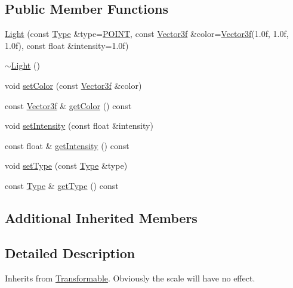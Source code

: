 \subsection*{Public Member Functions}
\begin{DoxyCompactItemize}
\item 
\hyperlink{classburn_1_1_light_a70a09e0609abe704f3e65d4790b6d6ce}{Light} (const \hyperlink{classburn_1_1_light_a8fa12cb3ae2a0eebbfbf5c59c2b4b599}{Type} \&type=\hyperlink{classburn_1_1_light_a8fa12cb3ae2a0eebbfbf5c59c2b4b599a9e95c3ab6dc0c16260ba514a02151ce7}{P\-O\-I\-N\-T}, const \hyperlink{namespaceburn_a9d6d349c94bc4dc9699427216128a0ef}{Vector3f} \&color=\hyperlink{namespaceburn_a9d6d349c94bc4dc9699427216128a0ef}{Vector3f}(1.\-0f, 1.\-0f, 1.\-0f), const float \&intensity=1.\-0f)
\item 
\hyperlink{classburn_1_1_light_af0fe1fa2f8f4527e80bd4ca80b2f6c4e}{$\sim$\-Light} ()
\item 
void \hyperlink{classburn_1_1_light_a6178f2826887a4aba596523b3e001604}{set\-Color} (const \hyperlink{namespaceburn_a9d6d349c94bc4dc9699427216128a0ef}{Vector3f} \&color)
\item 
const \hyperlink{namespaceburn_a9d6d349c94bc4dc9699427216128a0ef}{Vector3f} \& \hyperlink{classburn_1_1_light_a00de56025645f4c39d03b24e48f4eabf}{get\-Color} () const 
\item 
void \hyperlink{classburn_1_1_light_a798ae7d682b85dcede11a89047f19508}{set\-Intensity} (const float \&intensity)
\item 
const float \& \hyperlink{classburn_1_1_light_a0e826b840750ededc98e73f814c2de4a}{get\-Intensity} () const 
\item 
void \hyperlink{classburn_1_1_light_a1b0285cf5b58bc337a8d3ab9b4077554}{set\-Type} (const \hyperlink{classburn_1_1_light_a8fa12cb3ae2a0eebbfbf5c59c2b4b599}{Type} \&type)
\item 
const \hyperlink{classburn_1_1_light_a8fa12cb3ae2a0eebbfbf5c59c2b4b599}{Type} \& \hyperlink{classburn_1_1_light_aa96f8a2a736f033cd93f16467faad31b}{get\-Type} () const 
\end{DoxyCompactItemize}
\subsection*{Additional Inherited Members}


\subsection{Detailed Description}
Inherits from \hyperlink{classburn_1_1_transformable}{Transformable}. Obviously the scale will have no effect. 

